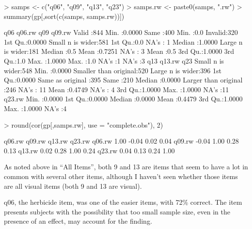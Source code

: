 \documentclass[11pt]{article}
\begin{document}
\begin{Schunk}
\begin{Sinput}
> samps <- c("q06", "q09", "q13", "q23")
> samps.rw <- paste0(samps, ".rw")
> summary(gp[,sort(c(samps, samps.rw))])
\end{Sinput}
\begin{Soutput}
      q06          q06.rw                     q09          q09.rw   
 Valid  :844   Min.   :0.0000   Same            :400   Min.   :0.0  
 Invalid:320   1st Qu.:0.0000   Small n is wider:581   1st Qu.:0.0  
 NA's   :  1   Median :1.0000   Large n is wider:181   Median :0.5  
               Mean   :0.7251   NA's            :  3   Mean   :0.5  
               3rd Qu.:1.0000                          3rd Qu.:1.0  
               Max.   :1.0000                          Max.   :1.0  
               NA's   :1                               NA's   :3    
               q13          q13.rw                          q23     
 Small n is wider:548   Min.   :0.0000   Smaller than original:520  
 Large n is wider:396   1st Qu.:0.0000   Same as original     :395  
 Same            :210   Median :0.0000   Larger than original :246  
 NA's            : 11   Mean   :0.4749   NA's                 :  4  
                        3rd Qu.:1.0000                              
                        Max.   :1.0000                              
                        NA's   :11                                  
     q23.rw      
 Min.   :0.0000  
 1st Qu.:0.0000  
 Median :0.0000  
 Mean   :0.4479  
 3rd Qu.:1.0000  
 Max.   :1.0000  
 NA's   :4       
\end{Soutput}
\begin{Sinput}
> round(cor(gp[,samps.rw], use = "complete.obs"), 2)
\end{Sinput}
\begin{Soutput}
       q06.rw q09.rw q13.rw q23.rw
q06.rw   1.00  -0.04   0.02   0.04
q09.rw  -0.04   1.00   0.28   0.13
q13.rw   0.02   0.28   1.00   0.24
q23.rw   0.04   0.13   0.24   1.00
\end{Soutput}
\end{Schunk}

As noted above in ``All Items'', both 9 and 13 are items that seem to have a lot in common with several other items, although I haven't seen whether those items are all visual items (both 9 and 13 are visual).

q06, the herbicide item, was one of the easier items, with 72\% correct.  The item presents subjects with the possibility that too small sample size, even in the presence of an effect, may account for the finding.
\end{document}
